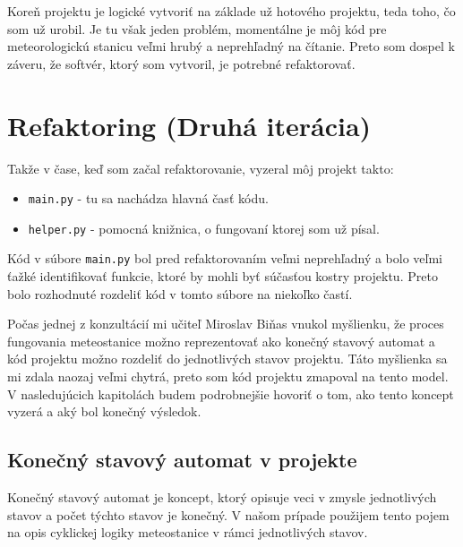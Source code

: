 Koreň projektu je logické vytvoriť na základe už hotového projektu, teda toho, čo som už urobil. Je tu však jeden problém, momentálne je môj kód pre meteorologickú stanicu veľmi hrubý a neprehľadný na čítanie. Preto som dospel k záveru, že softvér, ktorý som vytvoril, je potrebné refaktorovať.


\section{Refaktoring (Druhá iterácia)}
Takže v čase, keď som začal refaktorovanie, vyzeral môj projekt takto: 
\begin{itemize}
    \item \verb|main.py| - tu sa nachádza hlavná časť kódu. 
    \item \verb|helper.py| - pomocná knižnica, o fungovaní ktorej som už písal.
\end{itemize}

Kód v súbore \verb|main.py| bol pred refaktorovaním veľmi neprehľadný a bolo veľmi ťažké identifikovať funkcie, ktoré by mohli byť súčasťou kostry projektu. Preto bolo rozhodnuté rozdeliť kód v tomto súbore na niekoľko častí.

Počas jednej z konzultácií mi učiteľ Miroslav Biňas vnukol myšlienku, že proces fungovania meteostanice možno reprezentovať ako konečný stavový automat a kód projektu možno rozdeliť do jednotlivých stavov projektu. Táto myšlienka sa mi zdala naozaj veľmi chytrá, preto som kód projektu zmapoval na tento model. V nasledujúcich kapitolách budem podrobnejšie hovoriť o tom, ako tento koncept vyzerá a aký bol konečný výsledok.

\subsection{Konečný stavový automat v projekte}
Konečný stavový automat je koncept, ktorý opisuje veci v zmysle jednotlivých stavov a počet týchto stavov je konečný\cite{KA}. V našom prípade použijem tento pojem na opis cyklickej logiky meteostanice v rámci jednotlivých stavov.

